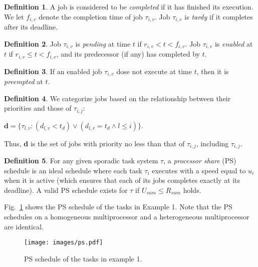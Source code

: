 \documentclass[Times, 10pt,twocolumn]{article}
\theoremstyle{definition}
\newtheorem{definition}{\textbf{Definition}}
\begin{document}
\begin{definition}
\label{def:enabled}
A job is considered to be \textit{completed} if it has finished its execution. We let $f_{i,v}$ denote the completion time of job $\tau_{i,v}$. Job $\tau_{i,v}$ is \textit{tardy} if it completes after its deadline.
\end{definition}

\begin{definition}
\label{def:pending}
 Job $\tau_{i,v}$ is \textit{pending} at time $t$ if $r_{i,v} < t < f_{i,v}$. Job $\tau_{i,v}$ is \textit{enabled} at $t$ if $r_{i,v} \leq t < f_{i,v}$, and its predecessor (if any) has completed by $t$.  \end{definition}





\begin{definition}
\label{preemption} If an enabled job $\tau_{i,v}$ dose not execute at time $t$, then it is \textit{preempted} at $t$. 
\end{definition}

\begin{definition}
\label{def:d}
We categorize jobs based on the relationship between their priorities and those of $\tau_{i,j}$:
\begin{center}
$\textbf{d} = \lbrace {\tau_{l,v}: (d_{l,v} < t_d) \vee (d_{l,v}=t_d \wedge  l \leq i)} \rbrace$.
\end{center}
\end{definition}
Thus, \textbf{d} is the set of jobs with priority no less than that of $\tau_{i,j}$, including $\tau_{i,j}$.
\begin{definition}
\label{def:PS}
For any given sporadic task system $\tau$, a \textit{processor share} (PS) schedule is an ideal schedule where each task $\tau_i$ executes with a speed equal to $u_i$ when it is active (which ensures that each of its jobs completes exactly at its deadline). A valid PS schedule exists for $\tau$ if $U_{sum} \leq R_{sum}$ holds. 

Fig.~\ref{fig:PSschedule} shows the PS schedule of the tasks in Example 1. Note that the PS schedules on a homogeneous multiprocessor and a heterogeneous multiprocessor are identical.
\end{definition}

\begin{figure}[t]
	\begin{center}
	\texttt{[image: images/ps.pdf]} 
	\end{center} 
\vspace{-5mm}
\caption{\small PS schedule of the tasks in example 1.}
\vspace{-5mm}
\label{fig:PSschedule}
\end{figure}
\end{document}
